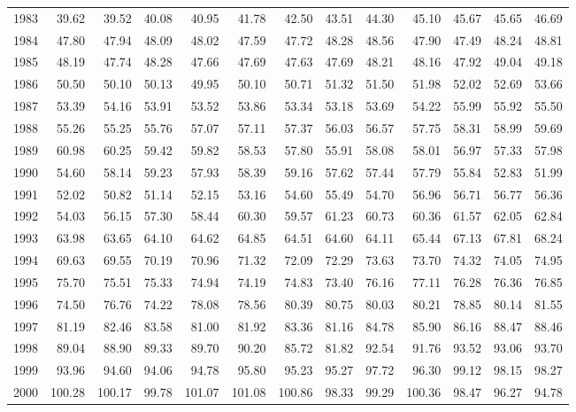 \begin{longtable}{rrrrrrrrrrrrr}
  1983 & 39.62 & 39.52 & 40.08 & 40.95 & 41.78 & 42.50 & 43.51 & 44.30 & 45.10 & 45.67 & 45.65 & 46.69 \\ 
  1984 & 47.80 & 47.94 & 48.09 & 48.02 & 47.59 & 47.72 & 48.28 & 48.56 & 47.90 & 47.49 & 48.24 & 48.81 \\ 
  1985 & 48.19 & 47.74 & 48.28 & 47.66 & 47.69 & 47.63 & 47.69 & 48.21 & 48.16 & 47.92 & 49.04 & 49.18 \\ 
  1986 & 50.50 & 50.10 & 50.13 & 49.95 & 50.10 & 50.71 & 51.32 & 51.50 & 51.98 & 52.02 & 52.69 & 53.66 \\ 
  1987 & 53.39 & 54.16 & 53.91 & 53.52 & 53.86 & 53.34 & 53.18 & 53.69 & 54.22 & 55.99 & 55.92 & 55.50 \\ 
  1988 & 55.26 & 55.25 & 55.76 & 57.07 & 57.11 & 57.37 & 56.03 & 56.57 & 57.75 & 58.31 & 58.99 & 59.69 \\ 
  1989 & 60.98 & 60.25 & 59.42 & 59.82 & 58.53 & 57.80 & 55.91 & 58.08 & 58.01 & 56.97 & 57.33 & 57.98 \\ 
  1990 & 54.60 & 58.14 & 59.23 & 57.93 & 58.39 & 59.16 & 57.62 & 57.44 & 57.79 & 55.84 & 52.83 & 51.99 \\ 
  1991 & 52.02 & 50.82 & 51.14 & 52.15 & 53.16 & 54.60 & 55.49 & 54.70 & 56.96 & 56.71 & 56.77 & 56.36 \\ 
  1992 & 54.03 & 56.15 & 57.30 & 58.44 & 60.30 & 59.57 & 61.23 & 60.73 & 60.36 & 61.57 & 62.05 & 62.84 \\ 
  1993 & 63.98 & 63.65 & 64.10 & 64.62 & 64.85 & 64.51 & 64.60 & 64.11 & 65.44 & 67.13 & 67.81 & 68.24 \\ 
  1994 & 69.63 & 69.55 & 70.19 & 70.96 & 71.32 & 72.09 & 72.29 & 73.63 & 73.70 & 74.32 & 74.05 & 74.95 \\ 
  1995 & 75.70 & 75.51 & 75.33 & 74.94 & 74.19 & 74.83 & 73.40 & 76.16 & 77.11 & 76.28 & 76.36 & 76.85 \\ 
  1996 & 74.50 & 76.76 & 74.22 & 78.08 & 78.56 & 80.39 & 80.75 & 80.03 & 80.21 & 78.85 & 80.14 & 81.55 \\ 
  1997 & 81.19 & 82.46 & 83.58 & 81.00 & 81.92 & 83.36 & 81.16 & 84.78 & 85.90 & 86.16 & 88.47 & 88.46 \\ 
  1998 & 89.04 & 88.90 & 89.33 & 89.70 & 90.20 & 85.72 & 81.82 & 92.54 & 91.76 & 93.52 & 93.06 & 93.70 \\ 
  1999 & 93.96 & 94.60 & 94.06 & 94.78 & 95.80 & 95.23 & 95.27 & 97.72 & 96.30 & 99.12 & 98.15 & 98.27 \\ 
  2000 & 100.28 & 100.17 & 99.78 & 101.07 & 101.08 & 100.86 & 98.33 & 99.29 & 100.36 & 98.47 & 96.27 & 94.78 \\ 

\end{longtable}
